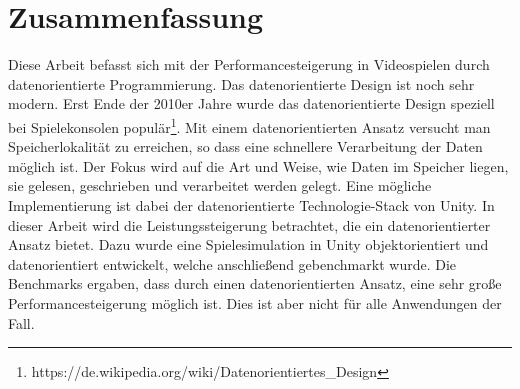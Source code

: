 \thispagestyle{empty}
\section*{Zusammenfassung}
Diese Arbeit befasst sich mit der Performancesteigerung in Videospielen durch datenorientierte Programmierung. Das datenorientierte Design ist noch sehr modern. Erst Ende der 2010er Jahre wurde das datenorientierte Design speziell bei Spielekonsolen populär\footnote{https://de.wikipedia.org/wiki/Datenorientiertes\_Design}. Mit einem datenorientierten Ansatz versucht man Speicherlokalität zu erreichen, so dass eine schnellere Verarbeitung der Daten möglich ist. Der Fokus wird auf die Art und Weise, wie Daten im Speicher liegen, sie gelesen, geschrieben und verarbeitet werden gelegt. Eine mögliche Implementierung ist dabei der datenorientierte Technologie-Stack von Unity. In dieser Arbeit wird die Leistungssteigerung betrachtet, die ein datenorientierter Ansatz bietet. Dazu wurde eine Spielesimulation in Unity objektorientiert und datenorientiert entwickelt, welche anschließend gebenchmarkt wurde. Die Benchmarks ergaben, dass durch einen datenorientierten Ansatz, eine sehr große Performancesteigerung möglich ist. Dies ist aber nicht für alle Anwendungen der Fall.


